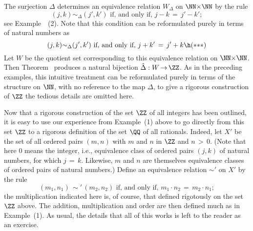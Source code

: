 {{{        The surjection ${\Delta}$ determines an equivalence relation $W_{{\Delta}}$ on ${\NN}{\times}{\NN}$ by the rule
        \begin{displaymath}
        (j,k) {\sim}_{{\Delta}} (j',k') \mbox{ if, and only if, } j-k \,=\, j'-k';
        \end{displaymath}
 see Example~~(2).
    Note that this condition can be reformulated purely in terms of natural numbers as
        \begin{displaymath}
        (j,k) {\sim}_{{\Delta}} (j',k') \mbox{ if, and only if, } j + k' \,=\, j' + k \h ({\ast}{\ast}{\ast})
        \end{displaymath}
    Let $W$ be the quotient set corresponding to this equivalence relation on ${\NN}{\times}{\NN}$.
    Then Theorem~ produces a natural bijection $\hat{{\Delta}}:W \,{\rightarrow}\, {\ZZ}$.
    As in the preceding examples, this intuitive treatment can be reformulated purely in terms of the structure on ${\NN}$,
    with no reference to the map ${\Delta}$, to give a rigorous construction of ${\ZZ}$
    the tedious details are omitted here.

        Now that a rigorous construction of the set ${\ZZ}$ of all integers has been outlined,
    it is easy to use our experience from Example~(1) above to go directly from this set ${\ZZ}$ to a rigorous definition of the set ${\QQ}$ of all rationals.
    Indeed, let $X'$ be the set of all ordered pairs $(m,n)$ with $m$ and $n$ in ${\ZZ}$ and $n\,>\,0$.
    (Note that here $0$ means the integer, i.e., equivalence class of ordered pairs $(j,k)$ of natural numbers, for which $j \,=\, k$.
    Likewise, $m$ and $n$ are themselves equivalence classes of ordered pairs of natural numbers.)
    Define an equivalence relation ${\sim}'$ on $X'$ by the rule
        \begin{displaymath}
        (m_{1}, n_{1}) \,{\sim}'\, (m_{2},n_{2}) \mbox{ if, and only if, }
        m_{1}{\cdot}n_{2} \,=\, m_{2}{\cdot}n_{1};
        \end{displaymath}
     the multiplication indicated here is, of course, that defined rigotously on the set ${\ZZ}$ above.
    The addition, multiplication and order are then defined much as in Example~(1).
    As usual, the details that all of this works is left to the reader as an exercise.

\VV

}}}
